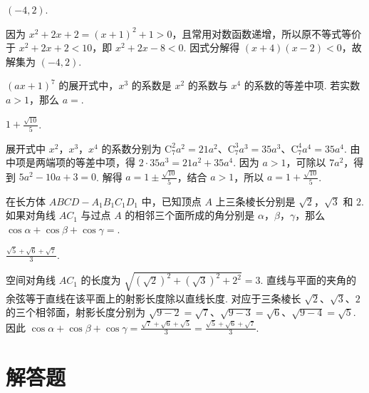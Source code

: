 \begin{answer}
\((-4,2)\).
\end{answer}

\begin{solution}
因为 \(x^2+2x+2=(x+1)^2+1>0\)，且常用对数函数递增，所以原不等式等价于 \(x^2+2x+2<10\)，即 \(x^2+2x-8<0\). 因式分解得 \((x+4)(x-2)<0\)，故解集为 \((-4,2)\).
\end{solution}

\begin{problem}
\(\left(ax + 1\right)^7\) 的展开式中，\(x^3\) 的系数是 \(x^2\) 的系数与 \(x^4\) 的系数的等差中项. 若实数 \(a > 1\)，那么 \(a=\)\fillinblank{}.
\end{problem}

\begin{answer}
\(1+\frac{\sqrt{10}}{5}\).
\end{answer}

\begin{solution}
展开式中 \(x^2\)，\(x^3\)，\(x^4\) 的系数分别为 \(\mathrm C_7^2a^2=21a^2\)、\(\mathrm C_7^3a^3=35a^3\)、\(\mathrm C_7^4a^4=35a^4\). 由中项是两端项的等差中项，得 \(2\cdot35a^3=21a^2+35a^4\). 因为 \(a>1\)，可除以 \(7a^2\)，得到 \(5a^2-10a+3=0\). 解得 \(a=1\pm\frac{\sqrt{10}}5\)，结合 \(a>1\)，所以 \(a=1+\frac{\sqrt{10}}5\).
\end{solution}

\begin{problem}
在长方体 \(ABCD - A_{1}B_{1}C_{1}D_{1}\) 中，已知顶点 \(A\) 上三条棱长分别是 \(\sqrt{2}\)，\(\sqrt{3}\) 和 \(2\). 如果对角线 \(AC_{1}\) 与过点 \(A\) 的相邻三个面所成的角分别是 \(\alpha\)，\(\beta\)，\(\gamma\)，那么 \(\cos \alpha + \cos \beta + \cos \gamma=\)\fillinblank{}.
\end{problem}

\begin{answer}
\(\frac{\sqrt5+\sqrt6+\sqrt7}{3}\).
\end{answer}

\begin{solution}
空间对角线 \(AC_1\) 的长度为 \(\sqrt{(\sqrt2)^2+(\sqrt3)^2+2^2}=3\). 直线与平面的夹角的余弦等于直线在该平面上的射影长度除以直线长度. 对应于三条棱长 \(\sqrt2\)、\(\sqrt3\)、\(2\) 的三个相邻面，射影长度分别为 \(\sqrt{9-2}=\sqrt7\)、\(\sqrt{9-3}=\sqrt6\)、\(\sqrt{9-4}=\sqrt5\). 因此 \(\cos\alpha+\cos\beta+\cos\gamma=\frac{\sqrt7+\sqrt6+\sqrt5}{3}=\frac{\sqrt5+\sqrt6+\sqrt7}{3}\).
\end{solution}

\section{解答题}

